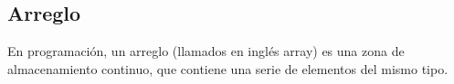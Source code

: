 \subsection{Arreglo}
En programación, un arreglo (llamados en inglés array) es una zona de almacenamiento continuo, que contiene una serie de elementos del mismo tipo.
